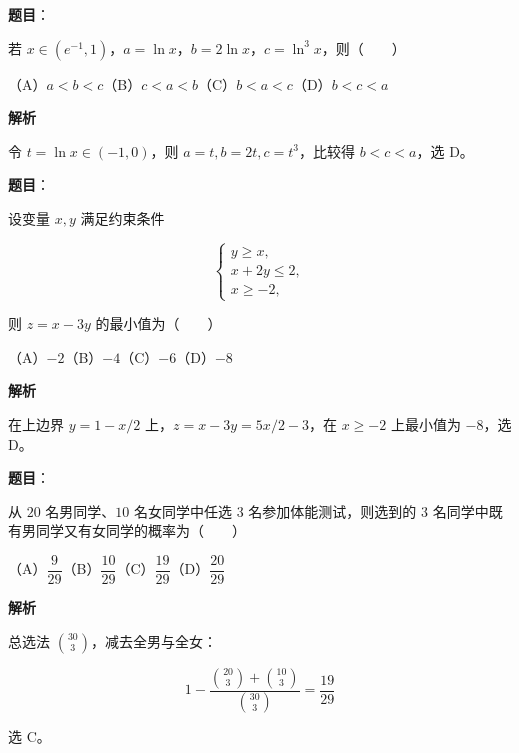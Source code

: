 \begin{answer}

\textbf{题目}：

若 $x\in(e^{-1},1)$，$a=\ln x$，$b=2\ln x$，$c=\ln^3x$，则\mbox{（　　）}

（A）$a<b<c$\quad（B）$c<a<b$\quad（C）$b<a<c$\quad（D）$b<c<a$

\textbf{解析}

令 $t=\ln x\in(-1,0)$，则 $a=t,b=2t,c=t^3$，比较得 $b<c<a$，选 D。


\end{answer}
\begin{answer}

\textbf{题目}：

设变量 $x,y$ 满足约束条件

\nopagebreak[4]
\[
\begin{cases}
y\geqslant x,\\
x+2y\leqslant2,\\
x\geqslant-2,
\end{cases}
\]

则 $z=x-3y$ 的最小值为\mbox{（　　）}

（A）$-2$\quad（B）$-4$\quad（C）$-6$\quad（D）$-8$

\textbf{解析}

在上边界 $y=1-x/2$ 上，$z=x-3y=5x/2-3$，在 $x\geqslant-2$ 上最小值为 $-8$，选 D。


\end{answer}
\begin{answer}

\textbf{题目}：

从 $20$ 名男同学、$10$ 名女同学中任选 $3$ 名参加体能测试，则选到的 $3$ 名同学中既有男同学又有女同学的概率为\mbox{（　　）}

（A）$\dfrac9{29}$\quad（B）$\dfrac{10}{29}$\quad（C）$\dfrac{19}{29}$\quad（D）$\dfrac{20}{29}$

\textbf{解析}

总选法 $\binom{30}{3}$，减去全男与全女：

\nopagebreak[4]
\[
1-\frac{\binom{20}{3}+\binom{10}{3}}{\binom{30}{3}}
=\frac{19}{29}
\]

选 C。


\end{answer}
